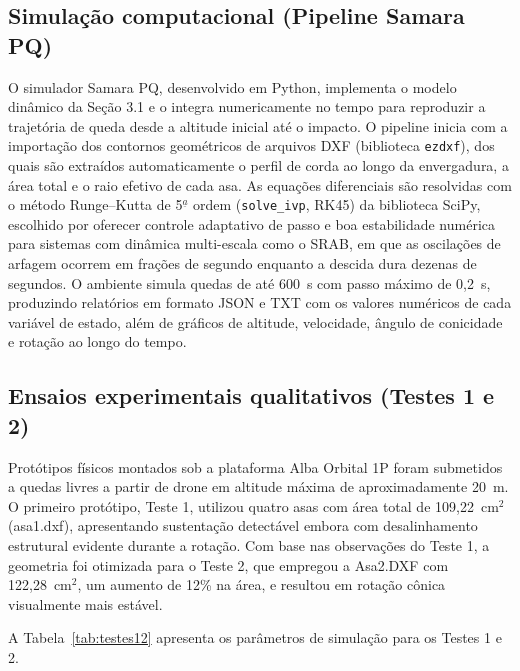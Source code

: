 \documentclass[12pt,fleqn]{article}
\begin{document}
\subsection{Simulação computacional (Pipeline Samara PQ)}

O simulador Samara PQ, desenvolvido em Python, implementa o modelo dinâmico da Seção 3.1 e o integra numericamente no tempo para reproduzir a trajetória de queda desde a altitude inicial até o impacto. O pipeline inicia com a importação dos contornos geométricos de arquivos DXF (biblioteca \texttt{ezdxf}), dos quais são extraídos automaticamente o perfil de corda ao longo da envergadura, a área total e o raio efetivo de cada asa. As equações diferenciais são resolvidas com o método Runge--Kutta de 5$^{\underline{a}}$ ordem (\texttt{solve\_ivp}, RK45) da biblioteca SciPy, escolhido por oferecer controle adaptativo de passo e boa estabilidade numérica para sistemas com dinâmica multi-escala como o SRAB, em que as oscilações de arfagem ocorrem em frações de segundo enquanto a descida dura dezenas de segundos. O ambiente simula quedas de até 600~s com passo máximo de 0,2~s, produzindo relatórios em formato JSON e TXT com os valores numéricos de cada variável de estado, além de gráficos de altitude, velocidade, ângulo de conicidade e rotação ao longo do tempo.

\subsection{Ensaios experimentais qualitativos (Testes 1 e 2)}

Protótipos físicos montados sob a plataforma Alba Orbital 1P foram submetidos a quedas livres a partir de drone em altitude máxima de aproximadamente 20~m. O primeiro protótipo, Teste 1, utilizou quatro asas com área total de 109,22~cm$^2$ (asa1.dxf), apresentando sustentação detectável embora com desalinhamento estrutural evidente durante a rotação. Com base nas observações do Teste 1, a geometria foi otimizada para o Teste 2, que empregou a Asa2.DXF com 122,28~cm$^2$, um aumento de 12\% na área, e resultou em rotação cônica visualmente mais estável.

A Tabela~\ref{tab:testes12} apresenta os parâmetros de simulação para os Testes 1 e 2.
\end{document}
